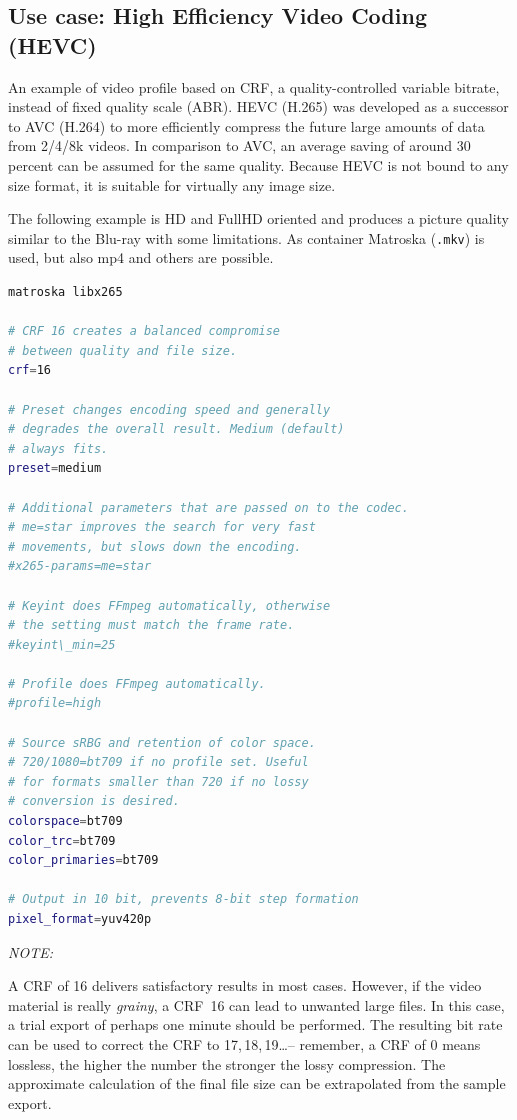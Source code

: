 \subsection{Use case: High Efficiency Video Coding (HEVC)}%
\label{sub:use_case_hevc}

An example of video profile based on CRF, a quality-controlled
variable bitrate, instead of fixed quality scale (ABR).
HEVC (H.265) was developed as a successor to AVC (H.264) to more
efficiently compress the future large amounts of data from 2/4/8k
videos.
In comparison to AVC, an average saving of around 30 percent can be
assumed for the same quality.
Because HEVC is not bound to any size format, it is suitable for
virtually any image size.

The following example is HD and FullHD oriented and produces a
picture quality similar to the Blu-ray with some limitations.
As container Matroska (\texttt{.mkv}) is used, but also mp4 and others are
possible.

\vspace{2ex} \begin{lstlisting}[language=bash,numbers=none]
matroska libx265

# CRF 16 creates a balanced compromise
# between quality and file size. 
crf=16

# Preset changes encoding speed and generally
# degrades the overall result. Medium (default)
# always fits.
preset=medium

# Additional parameters that are passed on to the codec.
# me=star improves the search for very fast
# movements, but slows down the encoding.
#x265-params=me=star

# Keyint does FFmpeg automatically, otherwise
# the setting must match the frame rate.
#keyint\_min=25

# Profile does FFmpeg automatically.
#profile=high

# Source sRBG and retention of color space.
# 720/1080=bt709 if no profile set. Useful
# for formats smaller than 720 if no lossy
# conversion is desired.
colorspace=bt709
color_trc=bt709
color_primaries=bt709

# Output in 10 bit, prevents 8-bit step formation
pixel_format=yuv420p
\end{lstlisting}

\noindent \textit{NOTE:}

A CRF of 16 delivers satisfactory results in most cases. However, if
the video material is really \emph{grainy}, a CRF~16 can lead to unwanted large files.  In this case, a trial export of perhaps one minute should be performed. The resulting bit rate can be used to correct the CRF to 17,\,18,\,19\ldots -- remember, a CRF of 0 means lossless, the higher the number the stronger the lossy compression. The approximate calculation of the final file size can be extrapolated from the sample export.

